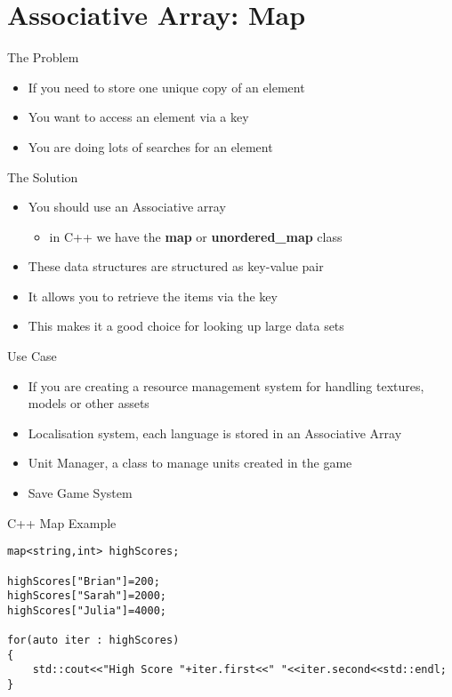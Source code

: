 \part{Associative Array: Map}
\frame{\partpage}

\begin{frame}{The Problem}
	\begin{itemize}
		\pause \item If you need to store one unique copy of an element
		\pause \item You want to access an element via a key
		\pause \item You are doing lots of searches for an element
	\end{itemize}
\end{frame}

\begin{frame}{The Solution}
	\begin{itemize}
		\pause \item You should use an Associative array
		\begin{itemize}
			\pause \item in C++ we have the \textbf{map} or \textbf{unordered\_map}  class
		\end{itemize} 
		\pause \item These data structures are structured as key-value pair
		\pause \item It allows you to retrieve the items via the key
		\pause \item This makes it a good choice for looking up large data sets
	\end{itemize}
\end{frame}

\begin{frame}{Use Case}
	\begin{itemize}
		\pause \item If you are creating a resource management system for handling textures, models or other assets
		\pause \item Localisation system, each language is stored in an Associative Array
		\pause \item Unit Manager, a class to manage units created in the game
		\pause \item Save Game System
	\end{itemize}
\end{frame}


\begin{frame}[fragile]{C++ Map
Example}
\begin{lstlisting}
map<string,int> highScores;

highScores["Brian"]=200;
highScores["Sarah"]=2000;
highScores["Julia"]=4000;

for(auto iter : highScores)
{
	std::cout<<"High Score "+iter.first<<" "<<iter.second<<std::endl;
}
\end{lstlisting}
\end{frame}

